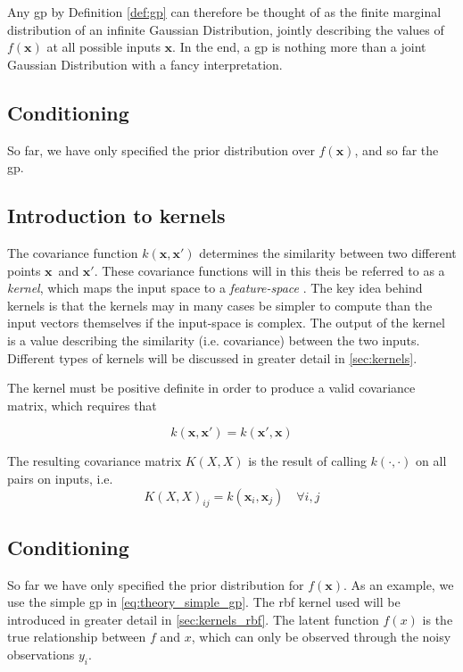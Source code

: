 Any \acrshort{gp} by Definition \ref{def:gp} can therefore be thought of as the finite marginal distribution of an infinite Gaussian Distribution, jointly describing the values of $f(\boldsymbol{x})$ at all possible inputs $\boldsymbol{x}$. In the end, a \acrshort{gp} is nothing more than a joint Gaussian Distribution with a fancy interpretation.

\subsection{Conditioning}
So far, we have only specified the prior distribution over $f(\boldsymbol{x})$, and so far the \acrshort{gp}.  

\subsection{Introduction to kernels}
The covariance function $k(\boldsymbol{x}, \boldsymbol{x}')$ determines the similarity between two different points $\boldsymbol{x}$ and $\boldsymbol{x}'$. These covariance functions will in this theis be referred to as a \textit{kernel}, which maps the input space to a \textit{feature-space} \cite{rasmussen}. The key idea behind kernels is that the kernels may in many cases be simpler to compute than the input vectors themselves if the input-space is complex. The output of the kernel is a value describing the similarity (i.e. covariance) between the two inputs. Different types of kernels will be discussed in greater detail in \cref{sec:kernels}.

The kernel must be positive definite in order to produce a valid covariance matrix, which requires that

\begin{equation}
    k(\boldsymbol{x}, \boldsymbol{x}') = k(\boldsymbol{x}', \boldsymbol{x})
\end{equation}

The resulting covariance matrix $K(X, X)$ is the result of calling $k(\cdot, \cdot)$ on all pairs on inputs, i.e.
\begin{equation}
    K(X, X)_{ij} = k(\boldsymbol{x}_i, \boldsymbol{x}_j) \quad \forall i, j
\end{equation}

\subsection{Conditioning}
So far we have only specified the prior distribution for $f(\boldsymbol{x})$. 
As an example, we use the simple \acrshort{gp} in \cref{eq:theory_simple_gp}. The \acrshort{rbf} kernel used will be introduced in greater detail in \cref{sec:kernels_rbf}. The latent function $f(x)$ is the true relationship between $f$ and $x$, which can only be observed through the noisy observations $y_i$. 

